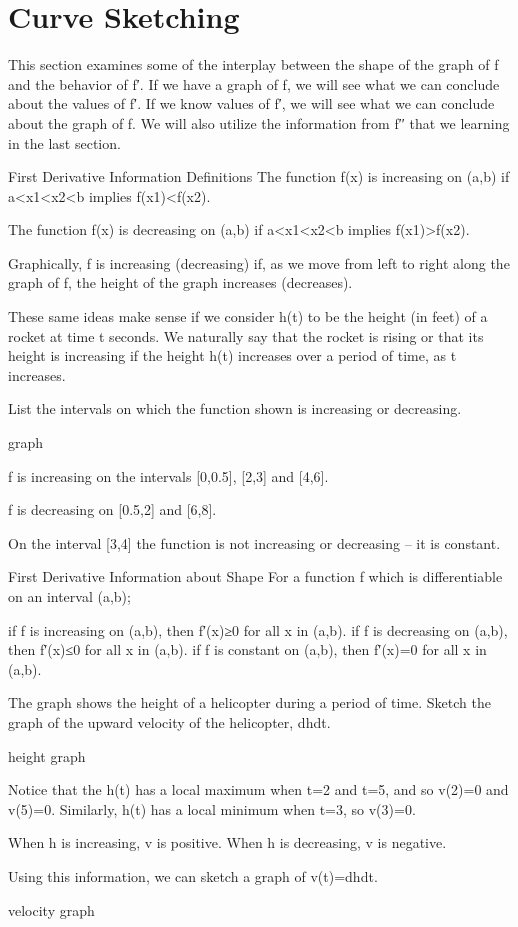 \section{Curve Sketching}
\label{sec:sketching}

This section examines some of the interplay between the shape of the graph of f and the behavior of f′. If we have a graph of f, we will see what we can conclude about the values of f′. If we know values of f′, we will see what we can conclude about the graph of f. We will also utilize the information from f′′ that we learning in the last section.

First Derivative Information
Definitions
The function f(x) is increasing on (a,b) if a<x1<x2<b implies f(x1)<f(x2).

The function f(x) is decreasing on (a,b) if a<x1<x2<b implies f(x1)>f(x2).

Graphically, f is increasing (decreasing) if, as we move from left to right along the graph of f, the height of the graph increases (decreases).

These same ideas make sense if we consider h(t) to be the height (in feet) of a rocket at time t seconds. We naturally say that the rocket is rising or that its height is increasing if the height h(t) increases over a period of time, as t increases.

\begin{example}
List the intervals on which the function shown is increasing or decreasing.

graph
\begin{solution} f is increasing on the intervals [0,0.5], [2,3] and [4,6].

f is decreasing on [0.5,2] and [6,8].

On the interval [3,4] the function is not increasing or decreasing – it is constant.
\end{solution}\end{example}

First Derivative Information about Shape
For a function f which is differentiable on an interval (a,b);

if f is increasing on (a,b), then f′(x)≥0 for all x in (a,b).
if f is decreasing on (a,b), then f′(x)≤0 for all x in (a,b).
if f is constant on (a,b), then f′(x)=0 for all x in (a,b).
\begin{example}
The graph shows the height of a helicopter during a period of time. Sketch the graph of the upward velocity of the helicopter, dhdt.

height graph
\begin{solution} Notice that the h(t) has a local maximum when t=2 and t=5, and so v(2)=0 and v(5)=0. Similarly, h(t) has a local minimum when t=3, so v(3)=0.

When h is increasing, v is positive. When h is decreasing, v is negative.

Using this information, we can sketch a graph of v(t)=dhdt.

velocity graph
\end{solution}\end{example}

